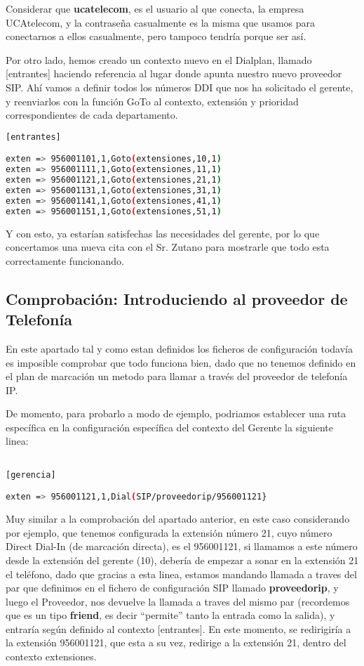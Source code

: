 Considerar que \textbf{ucatelecom}, es el usuario al que conecta, la empresa UCAtelecom, y la contraseña casualmente es la misma que usamos para conectarnos a ellos casualmente, pero tampoco tendría porque ser así.

Por otro lado, hemos creado un contexto nuevo en el Dialplan, llamado [entrantes] haciendo referencia al lugar donde apunta nuestro nuevo proveedor SIP. Ahí vamos a definir todos los números DDI que nos ha solicitado el gerente, y reenviarlos con la función GoTo al contexto, extensión y prioridad correspondientes de cada departamento.

\begin{lstlisting}[language=bash,title={/etc/asterisk/extensions.conf}]
[entrantes]

exten => 956001101,1,Goto(extensiones,10,1)
exten => 956001111,1,Goto(extensiones,11,1)
exten => 956001121,1,Goto(extensiones,21,1)
exten => 956001131,1,Goto(extensiones,31,1)
exten => 956001141,1,Goto(extensiones,41,1)
exten => 956001151,1,Goto(extensiones,51,1)
\end{lstlisting}

Y con esto, ya estarían satisfechas las necesidades del gerente, por lo que concertamos una nueva cita con el Sr. Zutano para mostrarle que todo esta correctamente funcionando.

\subsection{Comprobación: Introduciendo al proveedor de Telefonía}

En este apartado tal y como estan definidos los ficheros de configuración todavía es imposible comprobar que todo funciona bien, dado que no tenemos definido en el plan de marcación un metodo para llamar a través del proveedor de telefonía IP. 

De momento, para probarlo a modo de ejemplo, podriamos establecer una ruta específica en la configuración específica del contexto del Gerente la siguiente linea:

\begin{lstlisting}[language=bash,title={/etc/asterisk/extensions.conf}]

[gerencia]

exten => 956001121,1,Dial(SIP/proveedorip/956001121}

\end{lstlisting}

Muy similar a la comprobación del apartado anterior, en este caso considerando por ejemplo, que tenemos configurada la extensión número 21, cuyo número Direct Dial-In (de marcación directa), es el 956001121, si llamamos a este número desde la extensión del gerente (10), debería de empezar a sonar en la extensión 21 el teléfono, dado que gracias a esta linea, estamos mandando llamada a traves del par que definimos en el fichero de configuración SIP llamado \textbf{proveedorip}, y luego el Proveedor, nos devuelve la llamada a traves del mismo par (recordemos que es un tipo \textbf{friend}, es decir ``permite'' tanto la entrada como la salida), y entraría según definido al contexto [entrantes]. En este momento, se redirigiría a la extensión 956001121, que esta a su vez, redirige a la extensión 21, dentro del contexto extensiones.
